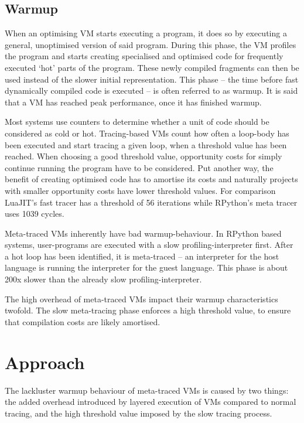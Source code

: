 \subsection{Warmup}

When an optimising VM starts executing a program, it does so by executing a
general, unoptimised version of said program. During this phase, the VM profiles
the program and starts creating specialised and optimised code for frequently
executed `hot' parts of the program. These newly compiled fragments can then be
used instead of the slower initial representation. This phase -- the time before
fast dynamically compiled code is executed -- is often referred to as warmup.
It is said that a VM has reached peak performance, once it has finished warmup.

Most systems use counters to determine whether a unit of code should be
considered as cold or hot. Tracing-based VMs count how often a loop-body has
been executed and start tracing a given loop, when a threshold value has been
reached. When choosing a good threshold value, opportunity costs for simply
continue running the program have to be considered. Put another way, the benefit
of creating optimised code has to amortise its costs and naturally projects with
smaller opportunity costs have lower threshold values. For comparison LuaJIT's
fast tracer has a threshold of 56 iterations while RPython's meta tracer uses
1039 cycles.

Meta-traced VMs inherently have bad warmup-behaviour. In RPython based systems,
user-programs are executed with a slow profiling-interpreter first. After a hot
loop has been identified, it is meta-traced -- an interpreter for the host
language is running the interpreter for the guest language. This phase is about
200x slower than the already slow profiling-interpreter.

The high overhead of meta-traced VMs impact their warmup characteristics
twofold. The slow meta-tracing phase enforces a high threshold value, to ensure
that compilation costs are likely amortised.

\section{Approach}

The lackluster warmup behaviour of meta-traced VMs is caused by two things: the
added overhead introduced by layered execution of VMs compared to normal
tracing, and the high threshold value imposed by the slow tracing process.

